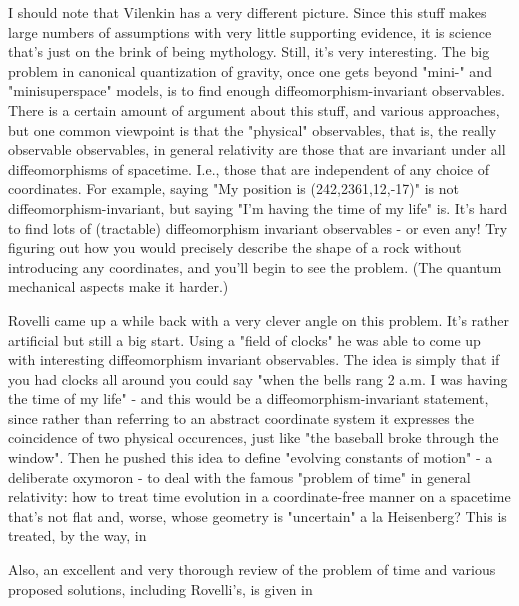 I should note that Vilenkin has a very different picture. Since this stuff makes large numbers of assumptions with very little supporting evidence, it is science that's just on the brink of being mythology. Still, it's very interesting.
The big problem in canonical quantization of gravity, once one gets beyond "mini-" and "minisuperspace" models, is to find enough diffeomorphism-invariant observables. There is a certain amount of argument about this stuff, and various approaches, but one common viewpoint is that the "physical" observables, that is, the really observable observables, in general relativity are those that are invariant under all diffeomorphisms of spacetime. I.e., those that are independent of any choice of coordinates. For example, saying "My position is (242,2361,12,-17)" is not diffeomorphism-invariant, but saying "I'm having the time of my life" is. It's hard to find lots of (tractable) diffeomorphism invariant observables - or even any! Try figuring out how you would precisely describe the shape of a rock without introducing any coordinates, and you'll begin to see the problem. (The quantum mechanical aspects make it harder.)

Rovelli came up a while back with a very clever angle on this problem. It's rather artificial but still a big start. Using a "field of clocks" he was able to come up with interesting diffeomorphism invariant observables. The idea is simply that if you had clocks all around you could say "when the bells rang 2 a.m. I was having the time of my life" - and this would be a diffeomorphism-invariant statement, since rather than referring to an abstract coordinate system it expresses the coincidence of two physical occurences, just like "the baseball broke through the window". Then he pushed this idea to define "evolving constants of motion" - a deliberate oxymoron - to deal with the famous "problem of time" in general relativity: how to treat time evolution in a coordinate-free manner on a spacetime that's not flat and, worse, whose geometry is "uncertain" a la Heisenberg? This is treated, by the way, in

Also, an excellent and very thorough review of the problem of time and various proposed solutions, including Rovelli's, is given in

